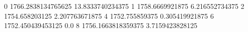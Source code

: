 0 1766.2838134765625 13.8333740234375
1 1758.6669921875 6.216552734375
2 1754.658203125 2.207763671875
4 1752.755859375 0.305419921875
6 1752.450439453125 0.0
8 1756.1663818359375 3.7159423828125

